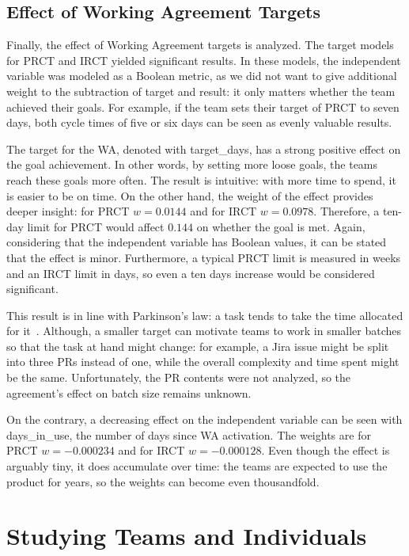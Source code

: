 \subsection{Effect of Working Agreement Targets}

Finally, the effect of Working Agreement targets is analyzed. The target models for PRCT and IRCT yielded significant results. In these models, the independent variable was modeled as a Boolean metric, as we did not want to give additional weight to the subtraction of target and result: it only matters whether the team achieved their goals. For example, if the team sets their target of PRCT to seven days, both cycle times of five or six days can be seen as evenly valuable results.

The target for the WA, denoted with target\_days, has a strong positive effect on the goal achievement. In other words, by setting more loose goals, the teams reach these goals more often. The result is intuitive: with more time to spend, it is easier to be on time. On the other hand, the weight of the effect provides deeper insight: for PRCT $w=0.0144$ and for IRCT $w=0.0978$. Therefore, a ten-day limit for PRCT would affect $0.144$ on whether the goal is met. Again, considering that the independent variable has Boolean values,  it can be stated that the effect is minor. Furthermore, a typical PRCT limit is measured in weeks and an IRCT limit in days, so even a ten days increase would be considered significant.

This result is in line with Parkinson's law: a task tends to take the time allocated for it~\cite{parkinson_cyril_parkinsons_1955}. Although, a smaller target can motivate teams to work in smaller batches so that the task at hand might change: for example, a Jira issue might be split into three PRs instead of one, while the overall complexity and time spent might be the same. Unfortunately, the PR contents were not analyzed, so the agreement's effect on batch size remains unknown.

On the contrary, a decreasing effect on the independent variable can be seen with days\_in\_use, the number of days since WA activation. The weights are for PRCT $w=-0.000234$ and for IRCT $w=-0.000128$. Even though the effect is arguably tiny, it does accumulate over time: the teams are expected to use the product for years, so the weights can become even thousandfold.

\section{Studying Teams and Individuals}

